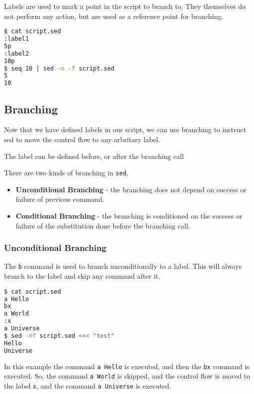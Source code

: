 Labels are used to mark a point in the script to branch to.
They themselves do not perform any action, but are used as a reference point for branching.

\begin{lstlisting}[language=bash]
$ cat script.sed
:label1
5p
:label2
10p
$ seq 10 | sed -n -f script.sed
5
10
\end{lstlisting}

\subsection{Branching}

Now that we have defined labels in our script, we can use branching to instruct sed to move the control flow to any arbritary label.

\begin{remark}
  The label can be defined before, or after the branching call
\end{remark}

There are two kinds of branching in \lstinline|sed|,

\begin{itemize}
  \item \textbf{Unconditional Branching} - the branching does not depend on success or failure of previous command.
  \item \textbf{Conditional Branching} - the branching is conditioned on the success or failure of the substitution done before the branching call.
\end{itemize}

\subsubsection{Unconditional Branching}

The \lstinline|b| command is used to branch unconditionally to a label.
This will always branch to the label and skip any command after it.

\begin{lstlisting}[language=bash]
$ cat script.sed
a Hello
bx
a World
:x
a Universe
$ sed -nf script.sed <<< "test"
Hello
Universe
\end{lstlisting}

In this example the command \lstinline|a Hello| is executed, and then the \lstinline|bx| command is executed.
So, the command \lstinline|a World| is skipped, and the control flow is moved to the label \lstinline|x|, and the command \lstinline|a Universe| is executed.

